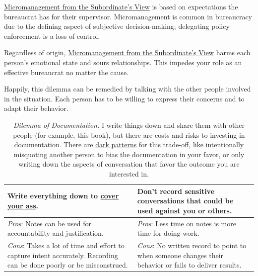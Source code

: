 \hyperref[table:dilemma-personal-solution-provider]{Micromanagement from the Subordinate's View} 
\iftoggle{printedonpaper}{ (\ref{table:dilemma-personal-solution-provider})}{} is 
based on expectations the bureaucrat has for their supervisor. Micromanagement is common in bureaucracy due to the defining aspect of subjective decision-making; delegating policy enforcement is a loss of control. 

Regardless of origin, \hyperref[table:dilemma-personal-solution-provider]{Micromanagement from the Subordinate's View} harms each person's emotional state and sours relationships. This impedes your role as an effective bureaucrat no matter the cause.

Happily, this dilemma can be remedied by talking with the other people involved in the situation. Each person has to be willing to express their concerns and to adapt their behavior. 

\begin{center}
\begin{table}[H] %
\begin{tabular}{ | m{\dilemmatablewidth}| m{\dilemmatablewidth} | } 
  \hline
  \textbf{Write everything down to \href{https://en.wikipedia.org/wiki/Cover_your_ass}{cover your ass}.
  \index{Wikipedia!cover your ass@\string\href{https://en.wikipedia.org/wiki/Cover_your_ass}{cover your ass}}
  } &
  \textbf{Don't record sensitive conversations that could be used against you or others.} \\
  \hline
  \textit{Pros}: Notes can be used for accountability and justification. &
  \textit{Pros}: Less time on notes is more time for doing work. \\
  \hline
  \textit{Cons}: Takes a lot of time and effort to capture intent accurately. Recording can be done poorly or be misconstrued.  & 
  \textit{Cons}: No written record to point to when someone changes their behavior or fails to deliver results. \\
  \hline
\end{tabular}
\caption{\textit{Dilemma of Documentation.}
I write things down and share them with other people (for example, this book), but there are costs and risks to investing in documentation. There are \href{https://en.wikipedia.org/wiki/Dark_pattern}{dark patterns}
for this trade-off, like intentionally misquoting another person to bias the documentation in your favor, or only writing down the aspects of conversation that favor the outcome you are interested in.  
}
\label{table:dilemma-personal-notes-or-no-notes}
\end{table}
\end{center}

